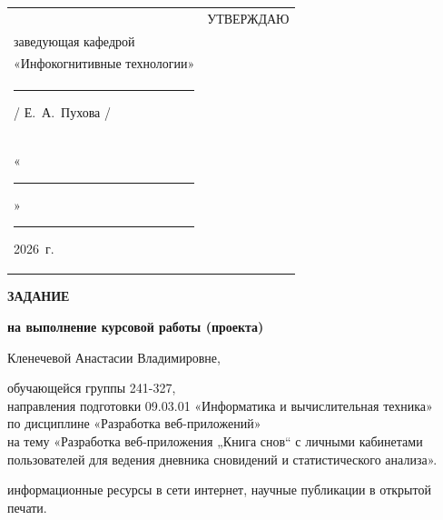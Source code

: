 \documentclass[14pt, a4paper]{extarticle}
\newcommand{\theme}{Разработка веб-приложения „Книга снов“ с личными кабинетами пользователей для ведения дневника сновидений и статистического анализа}
\begin{document}
\noindent
\hfill
\begin{tabularx}{\textwidth}{@{} p{} p{} @{}}
     &
    \raggedright
    УТВЕРЖДАЮ                          \\
    заведующая кафедрой                \\
    «Инфокогнитивные технологии»       \\[0.3cm]

    \rule{3cm}{0.4pt} / Е.~А.~Пухова / \\[0.1cm]

    «\rule{0.8cm}{0.4pt}» \rule{3cm}{0.4pt} 2026~г.
\end{tabularx}

\vspace{1cm}

\begin{center}
    {\large \textbf{ЗАДАНИЕ}}
    
    \textbf{на выполнение курсовой работы (проекта)}
    
    Кленечевой Анастасии Владимировне,
\end{center}

\noindent обучающейся группы 241-327,\\
 направления подготовки 09.03.01 «Информатика и вычислительная техника»\\
 по дисциплине «Разработка веб-приложений»\\
 на тему «\theme».


 информационные ресурсы в сети интернет, научные публикации в открытой печати.

\end{document}
